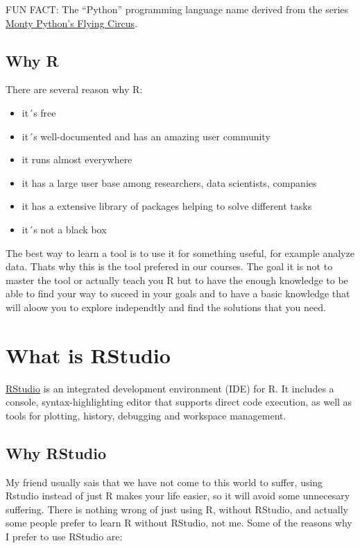 \documentclass[]{book}
\providecommand{\tightlist}{%
  \setlength{\itemsep}{0pt}\setlength{\parskip}{0pt}}
\theoremstyle{definition}
\theoremstyle{definition}
\theoremstyle{definition}
\theoremstyle{remark}
\begin{document}
FUN FACT: The ``Python'' programming language name derived from the
series
\href{https://en.wikipedia.org/wiki/Monty_Python\%27s_Flying_Circus}{Monty
Python's Flying Circus}.

\hypertarget{why-r}{%
\subsection{Why R}\label{why-r}}

There are several reason why R:

\begin{itemize}
\tightlist
\item
  it´s free
\item
  it´s well-documented and has an amazing user community
\item
  it runs almost everywhere
\item
  it has a large user base among researchers, data scientists, companies
\item
  it has a extensive library of packages helping to solve different
  tasks
\item
  it´s not a black box
\end{itemize}

The best way to learn a tool is to use it for something useful, for
example analyze data. Thats why this is the tool prefered in our
courses. The goal it is not to master the tool or actually teach you R
but to have the enough knowledge to be able to find your way to suceed
in your goals and to have a basic knowledge that will aloow you to
explore independtly and find the solutions that you need.

\hypertarget{what-is-rstudio}{%
\section{What is RStudio}\label{what-is-rstudio}}

\href{https://www.rstudio.com/products/RStudio/}{RStudio} is an
integrated development environment (IDE) for R. It includes a console,
syntax-highlighting editor that supports direct code execution, as well
as tools for plotting, history, debugging and workspace management.

\hypertarget{why-rstudio}{%
\subsection{Why RStudio}\label{why-rstudio}}

My friend usually sais that we have not come to this world to suffer,
using Rstudio instead of just R makes your life easier, so it will avoid
some unnecesary suffering. There is nothing wrong of just using R,
without RStudio, and actually some people prefer to learn R without
RStudio, not me. Some of the reasons why I prefer to use RStudio are:
\end{document}
